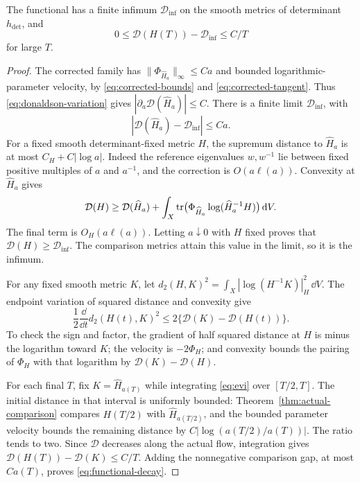 \begin{lemma}\label{lem:functional-decay}
The functional has a finite infimum \(\mathcal D_{\inf}\)
on the smooth metrics of determinant \(h_{\det}\), and
\begin{equation}\label{eq:functional-decay}
 0\le\mathcal D(H(T))-\mathcal D_{\inf}\le C/T
\end{equation}
for large \(T\).
\end{lemma}

\begin{proof}
The corrected family has
\(\|\Phi_{\widehat H_a}\|_\infty\le Ca\) and bounded
logarithmic-parameter velocity, by
\eqref{eq:corrected-bounds} and \eqref{eq:corrected-tangent}.
Thus \eqref{eq:donaldson-variation} gives
\(|\partial_a\mathcal D(\widehat H_a)|\le C\).
There is a finite limit \(\mathcal D_{\inf}\), with
\[
 |\mathcal D(\widehat H_a)-\mathcal D_{\inf}|\le Ca.
\]
For a fixed smooth determinant-fixed metric \(H\), the
supremum distance to \(\widehat H_a\) is at most
\(C_H+C|\log a|\). Indeed the reference eigenvalues
\(w,w^{-1}\) lie between fixed positive multiples
of \(a\) and \(a^{-1}\), and the correction is
\(O(a\ell(a))\). Convexity at \(\widehat H_a\) gives
\[
 \mathcal D(H)\ge\mathcal D(\widehat H_a)
 +\int_X\operatorname{tr}\bigl(\Phi_{\widehat H_a}
             \log(\widehat H_a^{-1}H)\bigr)\,\mathrm d V .
\]
The final term is \(O_H(a\ell(a))\). Letting \(a\downarrow0\)
with \(H\) fixed proves that \(\mathcal D(H)\ge\mathcal D_{\inf}\).
The comparison metrics attain this value in the limit,
so it is the infimum.

For any fixed smooth metric \(K\), let
\(d_2(H,K)^2=\int_X|\log(H^{-1}K)|_H^2\,\dd V\).
The endpoint variation of squared distance and convexity give
\begin{equation}\label{eq:evi}
 \frac12\frac{\dd}{\dd t}d_2(H(t),K)^2
 \le2\{\mathcal D(K)-\mathcal D(H(t))\}.
\end{equation}
To check the sign and factor, the gradient of half squared
distance at \(H\) is minus the logarithm toward \(K\);
the velocity is \(-2\Phi_H\); and convexity bounds the
pairing of \(\Phi_H\) with that logarithm by
\(\mathcal D(K)-\mathcal D(H)\).

For each final \(T\), fix \(K=\widehat H_{a(T)}\) while
integrating \eqref{eq:evi} over \([T/2,T]\).
The initial distance in that interval is uniformly bounded:
Theorem~\ref{thm:actual-comparison} compares \(H(T/2)\) with
\(\widehat H_{a(T/2)}\), and the bounded parameter velocity
bounds the remaining distance by
\(C|\log(a(T/2)/a(T))|\). The ratio tends to two.
Since \(\mathcal D\) decreases along the actual flow,
integration gives
\(\mathcal D(H(T))-\mathcal D(K)\le C/T\).
Adding the nonnegative comparison gap, at most \(Ca(T)\),
proves \eqref{eq:functional-decay}.
\end{proof}

